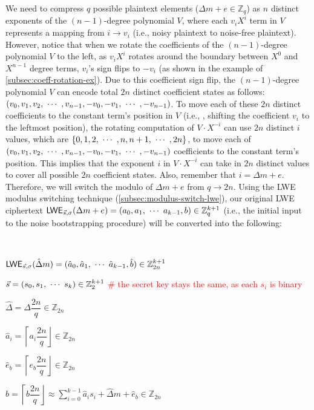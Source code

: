 We need to compress $q$ possible plaintext elements ($\Delta m + e \in \mathbb{Z}_q$) as $n$ distinct exponents of the $(n-1)$-degree polynomial $V$, where each $v_iX^i$ term in $V$ represents a mapping from $i \rightarrow v_i$ (i.e., noisy plaintext to noise-free plaintext). However, notice that when we rotate the coefficients of the $(n-1)$-degree polynomial $V$ to the left, as $v_iX^i$ rotates around the boundary between $X^0$ and $X^{n-1}$ degree terms, $v_i$'s sign flips to $-v_i$ (as shown in the example of \autoref{subsec:coeff-rotation-ex}). Due to this coefficient sign flip, the $(n-1)$-degree polynomial $V$ can encode total $2n$ distinct coefficient states as follows: $(v_0, v_1, v_2, \text{ } \text{$\cdots$} \text{ }, v_{n-1}, -v_0, -v_1, \text{ } \text{$\cdots$} \text{ }, -v_{n-1})$. To move each of these $2n$ distinct coefficients to the constant term's position in $V$ (i.e., , shifting the coefficient $v_i$ to the leftmost position), the rotating computation of $V \cdot X^{-i}$ can use $2n$ distinct $i$ values, which are $\{0, 1, 2, \text{ } \text{$\cdots$} \text{ }, n, n+1, \text{ } \text{$\cdots$} \text{ }, 2n\}$, to move each of $(v_0, v_1, v_2, \text{ } \text{$\cdots$} \text{ }, v_{n-1}, -v_0, -v_1, \text{ } \text{$\cdots$} \text{ }, -v_{n-1})$ coefficients to the constant term's position. This implies that the exponent $i$ in $V\cdot X^{-i}$ can take in $2n$ distinct values to cover all possible $2n$ coefficient states. Also, remember that $i = \Delta m + e$.  Therefore, we will switch the modulo of $\Delta m + e$ from $q \rightarrow 2n$. Using the LWE modulus switching technique (\autoref{subsec:modulus-switch-lwe}), our original LWE ciphertext $\textsf{LWE}_{\vec{s}, \sigma}(\Delta m + e) = ({a}_0, {a}_1, \text{ } \text{$\cdots$} \text{ } {a}_{k-1}, {b}) \in \mathbb{Z}_q^{k+1}$ (i.e., the initial input to the noise bootstrapping procedure) will be converted into the following: 

$ $

$\textsf{LWE}_{\vec{s}, \sigma}(\hat{\Delta} m) = (\hat{a}_0, \hat{a}_1, \text{ } \text{$\cdots$} \text{ } \hat{a}_{k-1}, \hat{b}) \in \mathbb{Z}_{2n}^{k+1}$

$\vec{s} = (s_0, s_1, \text{ } \text{$\cdots$} \text{ } s_k) \in \mathbb{Z}_2^{k+1}$  \textcolor{red}{\# the secret key stays the same, as each $s_i$ is binary}

$\hat{\Delta} = \Delta\dfrac{2n}{q} \in \mathbb{Z}_{2n}$

$\hat{a}_i = \left \lceil a_i\dfrac{2n}{q} \right \rfloor \in \mathbb{Z}_{2n}$

$\hat{e}_b = \left \lceil e_b\dfrac{2n}{q} \right \rfloor \in \mathbb{Z}_{2n}$

$\hat{b} = \left \lceil b\dfrac{2n}{q} \right \rfloor \approx \sum\limits_{i=0}^{k-1} \hat{a}_is_i + \hat{\Delta} m + \hat{e}_b  \in \mathbb{Z}_{2n}$



